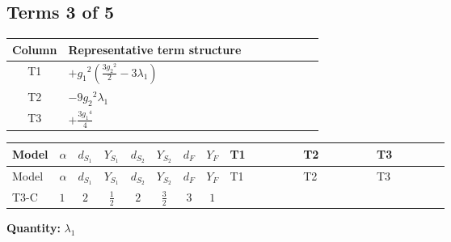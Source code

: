 \documentclass[8pt]{article}
\begin{document}
\begin{landscape}
\subsection*{Terms 3 of 5}
\begin{center}
\begin{tabular}{@{}c >{\raggedright\arraybackslash}p{0.82\linewidth}@{}}
\toprule
Column & Representative term structure \\
\midrule
T1 & \(\displaystyle +{g_1}^2 \left(\frac{3 {g_2}^2}{2}-3 {\lambda_1}\right)\) \\
\midrule
T2 & \(\displaystyle -9 {g_2}^2 {\lambda_1}\) \\
\midrule
T3 & \(\displaystyle +\frac{3 {g_1}^4}{4}\) \\
\midrule
\bottomrule
\end{tabular}
\end{center}
\smallskip
\tiny
\begin{longtable}{@{}llcccccc >{\raggedright\arraybackslash}p{0.21\linewidth} >{\raggedright\arraybackslash}p{0.21\linewidth} >{\raggedright\arraybackslash}p{0.21\linewidth}@{}}
\toprule
Model & $\alpha$ & $d_{S_1}$ & $Y_{S_1}$ & $d_{S_2}$ & $Y_{S_2}$ & $d_F$ & $Y_F$ & T1 & T2 & T3 \\
\midrule
\endfirsthead
\toprule
Model & $\alpha$ & $d_{S_1}$ & $Y_{S_1}$ & $d_{S_2}$ & $Y_{S_2}$ & $d_F$ & $Y_F$ & T1 & T2 & T3 \\
\midrule
\endhead
T3-C & $1$ & $2$ & $\frac{1}{2}$ & $2$ & $\frac{3}{2}$ & $3$ & $1$ & \scriptsize\adjustbox{max width=\linewidth}{$\begin{gathered} +{g_1}^2 \left(\frac{3 {g_2}^2}{2}-3 {\lambda_1}\right)\end{gathered}$} & \scriptsize\adjustbox{max width=\linewidth}{$\begin{gathered} -9 {g_2}^2 {\lambda_1}\end{gathered}$} & \scriptsize\adjustbox{max width=\linewidth}{$\begin{gathered} +\frac{3 {g_1}^4}{4}\end{gathered}$} \\
\midrule
\bottomrule
\end{longtable}
\clearpage
\noindent\textbf{Quantity: }$\lambda_1$\par\smallskip

\end{landscape}
\end{document}
